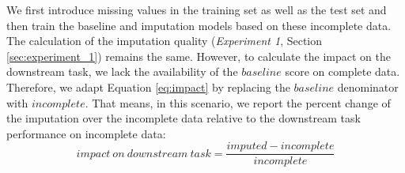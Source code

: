 We first introduce missing values in the training set as well as the test set and then train the baseline and imputation models based on these incomplete data. The calculation of the imputation quality (\emph{Experiment 1}, Section \ref{sec:experiment_1}) remains the same. However, to calculate the impact on the downstream task, we lack the availability of the $baseline$ score on complete data. Therefore, we adapt Equation \ref{eq:impact} by replacing the $baseline$ denominator with $incomplete$. That means, in this scenario, we report the percent change of the imputation over the incomplete data relative to the downstream task performance on incomplete data:
%
\begin{equation}
	impact\ on \ downstream\ task = \frac{imputed - incomplete}{incomplete}
	\label{eq:impact_scenario2}
\end{equation}
%
